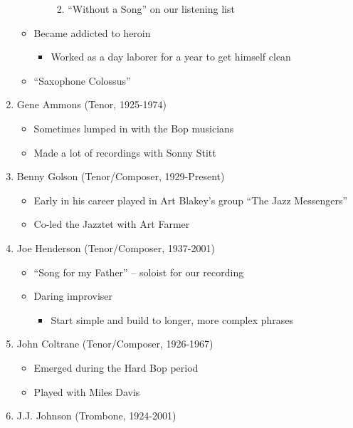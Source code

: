 \documentclass[]{article}
\providecommand{\tightlist}{%
  \setlength{\itemsep}{0pt}\setlength{\parskip}{0pt}}
\begin{document}
\begin{enumerate}
\begin{itemize}
\begin{itemize}
      \begin{enumerate}
      \def\labelenumii{\roman{enumii}.}
      \tightlist
      \item
        ``Without a Song'' on our listening list
      \end{enumerate}
    \end{itemize}
  \item
    Became addicted to heroin

    \begin{itemize}
    \tightlist
    \item
      Worked as a day laborer for a year to get himself clean
    \end{itemize}
  \item
    ``Saxophone Colossus''
  \end{itemize}
\item
  Gene Ammons (Tenor, 1925-1974)

  \begin{itemize}
  \tightlist
  \item
    Sometimes lumped in with the Bop musicians
  \item
    Made a lot of recordings with Sonny Stitt
  \end{itemize}
\item
  Benny Golson (Tenor/Composer, 1929-Present)

  \begin{itemize}
  \tightlist
  \item
    Early in his career played in Art Blakey's group ``The Jazz
    Messengers''
  \item
    Co-led the Jazztet with Art Farmer
  \end{itemize}
\item
  Joe Henderson (Tenor/Composer, 1937-2001)

  \begin{itemize}
  \tightlist
  \item
    ``Song for my Father'' -- soloist for our recording
  \item
    Daring improviser

    \begin{itemize}
    \tightlist
    \item
      Start simple and build to longer, more complex phrases
    \end{itemize}
  \end{itemize}
\item
  John Coltrane (Tenor/Composer, 1926-1967)

  \begin{itemize}
  \tightlist
  \item
    Emerged during the Hard Bop period
  \item
    Played with Miles Davis
  \end{itemize}
\item
  J.J. Johnson (Trombone, 1924-2001)


\end{enumerate}
\end{document}
